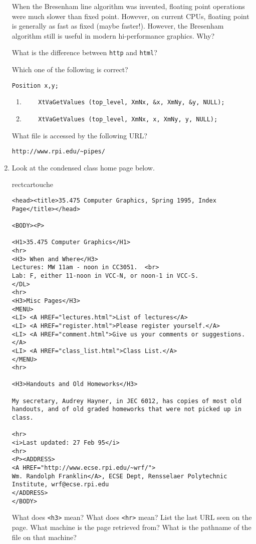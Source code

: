 \documentclass[twoside]{article}
\begin{document}
\begin{enumerate}
 When the Bresenham line algorithm was invented, floating
point operations were much slower than fixed point.  However, on
current CPUs, floating point is generally as fast as fixed (maybe
faster!).   However, the Bresenham algorithm still is useful in
modern hi-performance graphics.  Why?

 What is the difference between \verb+http+ and
\verb+html+?

 Which one of the following is correct?
\begin{verbatim}
Position x,y;
\end{verbatim}
\begin{enumerate}
\item \verb+    XtVaGetValues (top_level, XmNx, &x, XmNy, &y, NULL);+
\item \verb+    XtVaGetValues (top_level, XmNx, x, XmNy, y, NULL);+
\end{enumerate}

  What file is accessed by the following URL?

\verb+http://www.rpi.edu/~pipes/+

\item Look at the condensed class home page below.

\begin{center}
\footnotesize
\begin{boxitpara}{rectcartouche}
\begin{verbatim}
<head><title>35.475 Computer Graphics, Spring 1995, Index Page</title></head>

<BODY><P>

<H1>35.475 Computer Graphics</H1>
<hr>
<H3> When and Where</H3>
Lectures: MW 11am - noon in CC3051.  <br>
Lab: F, either 11-noon in VCC-N, or noon-1 in VCC-S.
</DL>
<hr>
<H3>Misc Pages</H3>
<MENU>
<LI> <A HREF="lectures.html">List of lectures</A>
<LI> <A HREF="register.html">Please register yourself.</A>
<LI> <A HREF="comment.html">Give us your comments or suggestions.</A>
<LI> <A HREF="class_list.html">Class List.</A>
</MENU>
<hr>

<H3>Handouts and Old Homeworks</H3>

My secretary, Audrey Hayner, in JEC 6012, has copies of most old
handouts, and of old graded homeworks that were not picked up in
class.

<hr>
<i>Last updated: 27 Feb 95</i>
<hr>
<P><ADDRESS>
<A HREF="http://www.ecse.rpi.edu/~wrf/">
Wm. Randolph Franklin</A>, ECSE Dept, Rensselaer Polytechnic
Institute, wrf@ecse.rpi.edu
</ADDRESS>
</BODY>
\end{verbatim}
\end{boxitpara}
\leavevmode %
\end{center}

\begin{enumerate}
 What does \verb+<h3>+ mean?
 What does \verb+<hr>+ mean?
 List the last URL seen on the page.  What machine is the
page retrieved from?  What is the pathname of the file on that machine?
\end{enumerate}
\end{enumerate}
\end{document}
